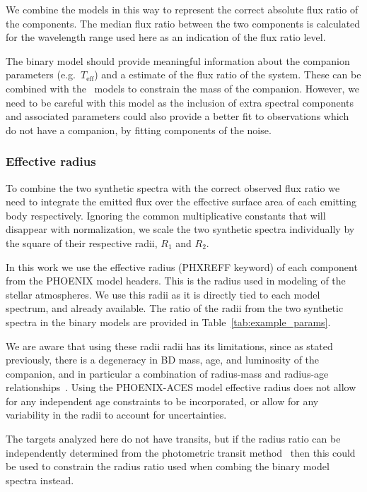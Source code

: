 \documentclass[fleqn,usenatbib]{mnras}
\begin{document}
We combine the models in this way to represent the correct absolute flux ratio of the components. The median flux ratio between the two components is calculated for the wavelength range used here as an indication of the flux ratio level.

The binary model should provide meaningful information about the companion parameters (e.g.\ \(T_{\textrm{eff}}\)) and a estimate of the flux ratio of the system. These can be combined with the~\citet{baraffe_evolutionary_2003} models to constrain the mass of the companion. However, we need to be careful with this model as the inclusion of extra spectral components and associated parameters could also provide a better fit to observations which do not have a companion, by fitting components of the noise.\\

\subsubsection{Effective radius}
\label{subsection-radius}

To combine the two synthetic spectra with the correct observed flux ratio we need to integrate the emitted flux over the effective surface area of each emitting body respectively. Ignoring the common multiplicative constants that will disappear with normalization, we scale the two synthetic spectra individually by the square of their respective radii, \(R_1\) and \(R_2\). 

In this work we use the effective radius (PHXREFF keyword) of each component from the PHOENIX model headers. This is the radius used in modeling of the stellar atmospheres. We use this radii as it is directly tied to each model spectrum, and already available. The ratio of the radii from the two synthetic spectra in the binary models are provided in Table~\ref{tab:example_params}.

We are aware that using these radii radii has its limitations, since as stated previously, there is a degeneracy in BD mass, age, and luminosity of the companion, and in particular a combination of radius-mass and radius-age relationships~\citep{sorahana_radii_2013}. Using the PHOENIX-ACES model effective radius does not allow for any independent age constraints to be incorporated, or allow for any variability in the radii to account for uncertainties.

The targets analyzed here do not have transits, but if the radius ratio can be independently determined from the photometric transit method~\citep{deeg_photometric_1998} then this could be used to constrain the radius ratio used when combing the binary model spectra instead.
\end{document}
